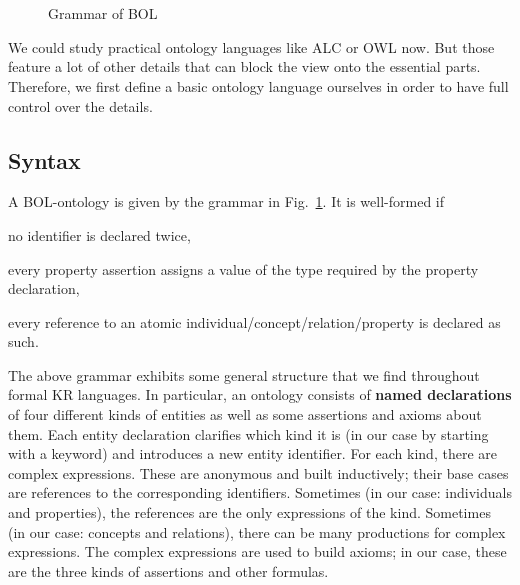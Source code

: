 \begin{figure}[hbt]
\begin{commgrammar}
\\
\\
\\
\\
\\
\\
\\
\end{commgrammar}
\caption{Grammar of BOL}\label{fig:bol}
\end{figure}

\clearpage

We could study practical ontology languages like ALC or OWL now.
But those feature a lot of other details that can block the view onto the essential parts.
Therefore, we first define a basic ontology language ourselves in order to have full control over the details.

\subsection{Syntax}

\begin{definition}
A BOL-ontology is given by the grammar in Fig.~\ref{fig:bol}.
It is well-formed if
\begin{compactitem}
 \item no identifier is declared twice,
 \item every property assertion assigns a value of the type required by the property declaration,
 \item every reference to an atomic individual/concept/relation/property is declared as such.
\end{compactitem}
\end{definition}

The above grammar exhibits some general structure that we find throughout formal KR languages.
In particular, an ontology consists of \textbf{named declarations} of four different kinds of entities as well as some assertions and axioms about them.
Each entity declaration clarifies which kind it is (in our case by starting with a keyword) and introduces a new entity identifier.
For each kind, there are complex expressions.
These are anonymous and built inductively; their base cases are references to the corresponding identifiers.
Sometimes (in our case: individuals and properties), the references are the only expressions of the kind.
Sometimes (in our case: concepts and relations), there can be many productions for complex expressions.
The complex expressions are used to build axioms; in our case, these are the three kinds of assertions and other formulas.

